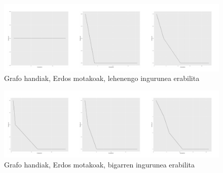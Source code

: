 \documentclass[eu,gi]{ifirak}\usepackage[]{graphicx}\usepackage[]{color}
\makeatletter
\def\maxwidth{ %
  \ifdim\Gin@nat@width>\linewidth
    \linewidth
  \else
    \Gin@nat@width
  \fi
}
\newenvironment{knitrout}{}{} %
\makeatother
\begin{document}
\begin{center}	
\begin{knitrout}
\color{fgcolor}\begin{figure}[!h]
\includegraphics[width=\maxwidth]{figure/unnamed-chunk-13-1} \caption[Grafo handiak, Erdos motakoak, lehenengo ingurunea erabilita]{Grafo handiak, Erdos motakoak, lehenengo ingurunea erabilita}\label{fig:unnamed-chunk-13}
\end{figure}


\end{knitrout}
\end{center}


\begin{center}	
\begin{knitrout}
\color{fgcolor}\begin{figure}[!h]
\includegraphics[width=\maxwidth]{figure/unnamed-chunk-14-1} \caption[Grafo handiak, Erdos motakoak, bigarren ingurunea erabilita]{Grafo handiak, Erdos motakoak, bigarren ingurunea erabilita}\label{fig:unnamed-chunk-14}
\end{figure}


\end{knitrout}
\end{center}
\end{document}
